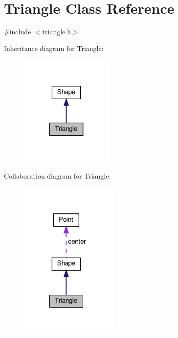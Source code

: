 \hypertarget{class_triangle}{}\section{Triangle Class Reference}
\label{class_triangle}


{\ttfamily \#include $<$triangle.\+h$>$}



Inheritance diagram for Triangle\+:
\nopagebreak
\begin{figure}[H]
\begin{center}
\leavevmode
\includegraphics[width=131pt]{class_triangle__inherit__graph}
\end{center}
\end{figure}


Collaboration diagram for Triangle\+:
\nopagebreak
\begin{figure}[H]
\begin{center}
\leavevmode
\includegraphics[width=137pt]{class_triangle__coll__graph}
\end{center}
\end{figure}
